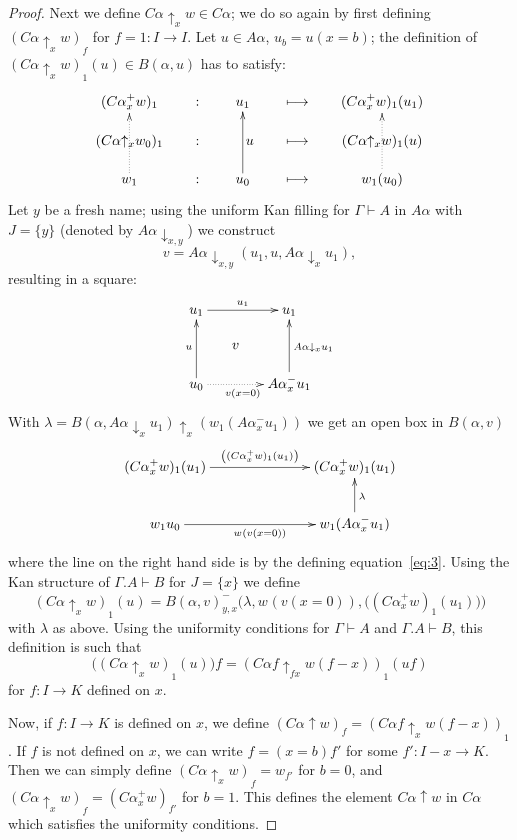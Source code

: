 \documentclass[10pt,a4paper]{article}
\newcommand{\set}[1]{\{#1\}}
\newcommand{\lto}{\longmapsto}
\newcommand{\rup}[1]{#1{\uparrow}}
\newcommand{\rdo}[1]{#1{\downarrow}}
\newcommand{\rupx}[1]{#1{\uparrow_{x}}}
\newcommand{\rdox}[1]{#1{\downarrow_{x}}}
\newcommand{\rdoxy}[1]{#1{\downarrow_{x,y}}}
\newcommand{\del}[1]{}
\begin{document}
\begin{proof}
  Next we define $\rup{C \alpha}_x w \in C \alpha$; we do so again by
  first defining $(\rup{C \alpha}_x w)_f$ for $f = 1 \colon I \to I$.
  Let $u \in A \alpha$, $u_b = u (x = b)$; the definition of
  $(\rupx{C\alpha} w)_1 (u) \in B(\alpha,u)$ has to satisfy:
  \[
  \xymatrix@R=.4cm@C=.6cm {({C \alpha}^+_x w)_1 &:& u_1 \del{\in
      A\alpha(x=1)} &\lto & ({C \alpha}^+_x w)_1 (u_1)
    \del{\in B(\alpha(x=1),u_1)}\\
    (\rupx{C\alpha}w_0)_1 &:& ~~~u\del{\in A\alpha} &\lto &
    (\rupx{C\alpha} w)_1 (u)\del{\in B(\alpha,u)}\\
    w_1\ar@{.>}[uu] &:& u_0\del{\in A\alpha(x=0)}\ar[uu] &\lto &
    w_1 (u_0)\del{\in B(\alpha(x=0),u_0)}\ar@{.>}[uu]\\
  }
  \]
  Let $y$ be a fresh name; using the uniform Kan filling for $\Gamma
  \vdash A$ in $ A \alpha $ with $J = \set {y}$ (denoted by
  $\rdoxy{A\alpha}$) we construct
  \[
  v = \rdoxy{A\alpha} {(u_1 ,u,\rdox{A\alpha} u_1)},
  \]
  resulting in a square:
  \[
  \xymatrix@R=.5cm@C=.5cm{
    u_1 \ar[rr]^{u_1 } & & u_1 \\
    & v & \\
    u_0 \ar[uu]^u \ar@{.>}[rr]_{v (x=0)} & & {A \alpha}^-_x u_1
    \ar[uu]_{ \rdox{A \alpha} u_1} }
  \]
  With $\lambda = \rupx {B(\alpha,\rdo{A\alpha}_x u_1)} (w_1
  (A\alpha^-_x u_1))$ we get an open box in $B (\alpha , v)$
  \[
  \xymatrix@C=2.5cm{ ({C \alpha}^+_x w)_1 (u_1) \ar[r]^{\left(({C
          \alpha}^+_x w)_1 (u_1)\right) }& ({C \alpha}^+_x w)_1
    (u_1) \\
    w_1 u_0 \ar[r]_{w_{} (v (x=0))} & w_1 ({A \alpha}^-_x u_1)
    \ar[u]_\lambda}
  \]
  where the line on the right hand side is by the defining
  equation~\eqref{eq:3}.  Using the Kan structure of $\Gamma.A\vdash
  B$ for $J=\set{x}$ we define
  \[
  (\rupx{C\alpha}w)_1 (u) = {B(\alpha,v)}^-_{y,x}\bigl(\lambda,
  w_{} (v (x=0)), {\bigl(({C \alpha}^+_x w)_1 (u_1)\bigr)
    }\bigr)
  \]
  with $\lambda$ as above.  Using the uniformity conditions for
  $\Gamma \vdash A$ and $\Gamma.A \vdash B$, this definition is such
  that
  \[
  \bigl((\rupx{C\alpha}w)_1 (u)\bigr) f = (\rup{C\alpha f}_{fx} {w
    (f-x)})_1 (u f)
  \]
  for $f \colon I \to K$ defined on $x$.

  Now, if $f:I\to K$ is defined on $x$, we define $(\rup{C\alpha} w)_f
  = (\rupx{C \alpha f} w (f-x))_1$.  If $f$ is not defined on $x$, we
  can write $f=(x=b)f'$ for some $f':I-x \to K$.  Then we can simply
  define $(\rupx{ C\alpha} w)_f = w_{f'}$ for $b=0$, and $(\rupx{
    C\alpha} w)_f = ({C \alpha}^+_x w)_{f'}$ for $b=1$.  This defines
  the element $\rup{C\alpha} w$ in $C \alpha$ which satisfies the
  uniformity conditions.


\end{proof}
\end{document}
